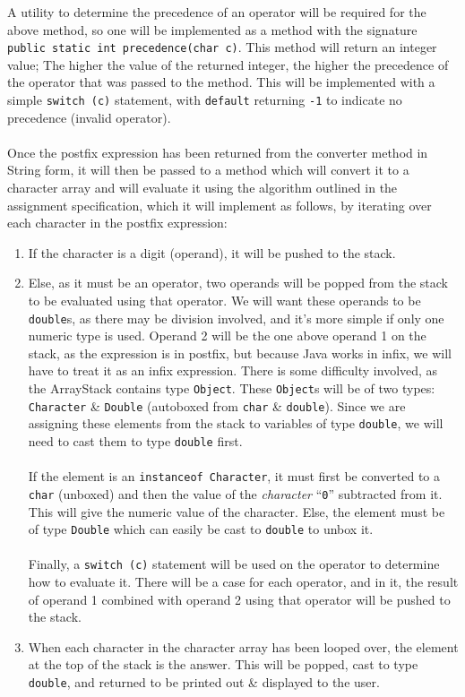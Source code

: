 \documentclass[a4paper]{article}
\begin{document}
A utility to determine the precedence of an operator will be required for the above method, so one will be implemented as a 
method with the signature \verb|public static int precedence(char c)|. 
This method will return an integer value; The higher the value of the returned integer, the higher the precedence of the operator 
that was passed to the method. 
This will be implemented with a simple \verb|switch (c)| statement, with \verb|default| returning \verb|-1| to indicate no 
precedence (invalid operator).
\\\\
Once the postfix expression has been returned from the converter method in String form, it will then be passed to a method 
which will convert it to a character array and will evaluate it using the algorithm outlined in the assignment specification,
which it will implement as follows, by iterating over each character in the postfix expression:
\begin{enumerate}
    \item   If the character is a digit (operand), it will be pushed to the stack. 
    \item   Else, as it must be an operator, two operands will be popped from the stack to be evaluated using that operator.
            We will want these operands to be \verb|double|s, as there may be division involved, and it's more simple if only 
            one numeric type is used.
            Operand 2 will be the one above operand 1 on the stack, as the expression is in postfix, but because Java works in 
            infix, we will have to treat it as an infix expression.
            There is some difficulty involved, as the ArrayStack contains type \verb|Object|. 
            These \verb|Object|s will be of two types: \verb|Character| \& \verb|Double| (autoboxed from \verb|char| \& \verb|double|). 
            Since we are assigning these elements from the stack to variables of type \verb|double|, we will need to cast them to type 
            \verb|double| first. 
            \\\\
            If the element is an \verb|instanceof Character|, it must first be converted to a \verb|char| (unboxed) and then 
            the value of the \textit{character} ``\verb|0|'' subtracted from it. 
            This will give the numeric value of the character.
            Else, the element must be of type \verb|Double| which can easily be cast to \verb|double| to unbox it.
            \\\\
            Finally, a \verb|switch (c)| statement will be used on the operator to determine how to evaluate it.
            There will be a case for each operator, and in it, the result of operand 1 combined with operand 2 using that operator 
            will be pushed to the stack.
    \item   When each character in the character array has been looped over, the element at the top of the stack is the answer. 
            This will be popped, cast to type \verb|double|, and returned to be printed out \& displayed to the user.
\end{enumerate}
\end{document}
